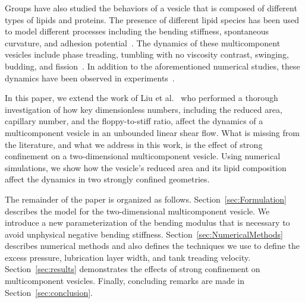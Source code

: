 \documentclass[twoside,twocolumn,9pt]{article}
\begin{document}
Groups have also studied the behaviors of a vesicle that is composed of different types of lipids and proteins. The presence of different lipid species has been used to model different processes including the bending stiffness, spontaneous curvature, and adhesion potential~\cite{zha-das-du2010, tan-yan-ima2011}. The dynamics of these multicomponent vesicles include phase treading, tumbling with no viscosity contrast, swinging, budding, and fission~\cite{soh-tse-li-voi-low2010, wan-du2008, all-ama2006, ger-sal-spa2022, lip1992, urs-klu-phi2009}. In addition to the aforementioned numerical studies, these dynamics have been observed in experiments~\cite{bag-sun2009, yan-ima-tan2010, yan-ima-tan2008, dre-jah-bob-spa-gop2021}.

In this paper, we extend the work of Liu et al.~\cite{liu-mar-li-vee-low2017} who performed a thorough investigation of how key dimensionless numbers, including the reduced area, capillary number, and the floppy-to-stiff ratio, affect the dynamics of a multicomponent vesicle in an unbounded linear shear flow. What is missing from the literature, and what we address in this work, is the effect of strong confinement on a two-dimensional multicomponent vesicle. Using numerical simulations, we show how the vesicle's reduced area and its lipid composition affect the dynamics in two strongly confined geometries.

The remainder of the paper is organized as follows. Section~\ref{sec:Formulation} describes the model for the two-dimensional multicomponent vesicle. We introduce a new parameterization of the bending modulus that is necessary to avoid unphysical negative bending stiffness. Section~\ref{sec:NumericalMethods} describes numerical methods and also defines the techniques we use to define the excess pressure, lubrication layer width, and tank treading velocity. Section~\ref{sec:results} demonstrates the effects of strong confinement on multicomponent vesicles. Finally, concluding remarks are made in Section~\ref{sec:conclusion}.


\end{document}
